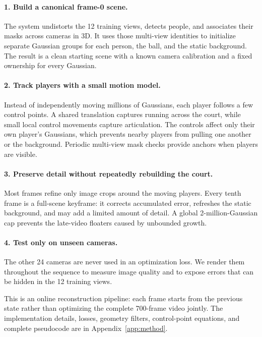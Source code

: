 \documentclass[11pt]{article}
\begin{document}
\paragraph{1. Build a canonical frame-0 scene.}
The system undistorts the 12 training views, detects people, and associates their masks across
cameras in 3D. It uses those multi-view identities to initialize separate Gaussian groups for each
person, the ball, and the static background. The result is a clean starting scene with a known
camera calibration and a fixed ownership for every Gaussian.

\paragraph{2. Track players with a small motion model.}
Instead of independently moving millions of Gaussians, each player follows a few control points.
A shared translation captures running across the court, while small local control movements capture
articulation. The controls affect only their own player's Gaussians, which prevents nearby players
from pulling one another or the background. Periodic multi-view mask checks provide anchors when
players are visible.

\paragraph{3. Preserve detail without repeatedly rebuilding the court.}
Most frames refine only image crops around the moving players. Every tenth frame is a full-scene
keyframe: it corrects accumulated error, refreshes the static background, and may add a limited
amount of detail. A global 2-million-Gaussian cap prevents the late-video floaters caused by
unbounded growth.

\paragraph{4. Test only on unseen cameras.}
The other 24 cameras are never used in an optimization loss. We render them throughout the sequence
to measure image quality and to expose errors that can be hidden in the 12 training views.

This is an online reconstruction pipeline: each frame starts from the previous state rather than
optimizing the complete 700-frame video jointly. The implementation details, losses, geometry
filters, control-point equations, and complete pseudocode are in Appendix~\ref{app:method}.
\end{document}
